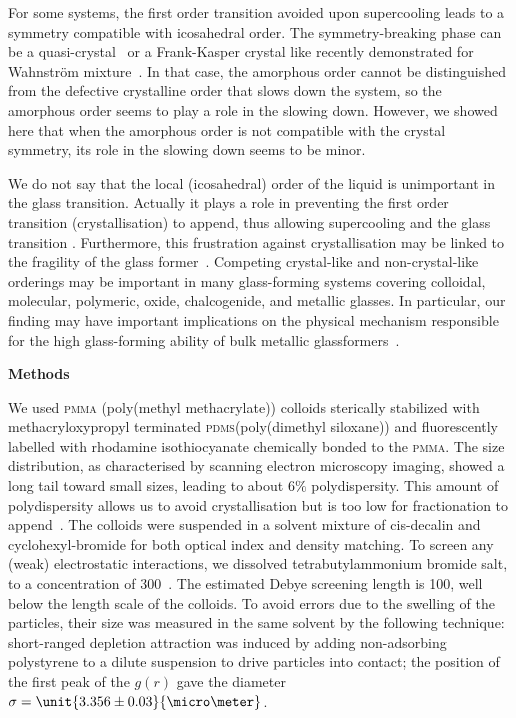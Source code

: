 For some systems, the first order transition avoided upon supercooling leads to a symmetry compatible with icosahedral order. The symmetry-breaking phase can be a quasi-crystal~\citep{Doye2003} or a Frank-Kasper crystal like recently demonstrated for Wahnstr\"om mixture~\citep{Pedersen2010}. In that case, the amorphous order cannot be distinguished from the defective crystalline order that slows down the system, so the amorphous order seems to play a role in the slowing down. However, we showed here that when the amorphous order is not compatible with the crystal symmetry, its role in the slowing down seems to be minor.

We do not say that the local (icosahedral) order of the liquid is unimportant in the glass transition. Actually it plays a role in preventing the first order transition (crystallisation) to append, thus allowing supercooling and the glass transition \cite{TanakaMJPCM}. Furthermore, this frustration against crystallisation may be linked to the fragility of the glass former~\citep{TanakaGJPCM,tanaka2010critical}. Competing crystal-like and non-crystal-like orderings may be important in many glass-forming systems covering colloidal, molecular, polymeric, oxide, chalcogenide, and metallic glasses. In particular, our finding may have important implications on the physical mechanism responsible for the high glass-forming ability of bulk metallic glassformers~\cite{Wang2004}. 

\vspace{1cm}
\noindent
\textbf{Methods}

We used \textsc{pmma} (poly(methyl methacrylate)) colloids sterically stabilized with methacryloxypropyl terminated \textsc{pdms}(poly(dimethyl siloxane)) and fluorescently labelled with rhodamine isothiocyanate chemically bonded to the \textsc{pmma}. The size distribution, as characterised by scanning electron microscopy imaging, showed a long tail toward small sizes, leading to about $6\%$ polydispersity. This amount of polydispersity allows us to avoid crystallisation but is too low for fractionation to append~\citep{Fasolo2003}. The colloids were suspended in a solvent mixture of cis-decalin and cyclohexyl-bromide for both optical index and density matching. To screen any (weak) electrostatic interactions, we dissolved tetrabutylammonium bromide salt, to a concentration of \unit{300}{\nano\mole\per\liter}~\citep{royall2005}. The estimated Debye screening length is \unit{100}{\nano\metre}, well below the length scale of the colloids. To avoid errors due to the swelling of the particles, their size was measured in the same solvent by the following technique: short-ranged depletion attraction was induced by adding non-adsorbing polystyrene to a dilute suspension to drive particles into contact; the position of the first peak of the $g(r)$ gave the diameter $\sigma = \unit{3.356\pm0.03}{\micro\meter}$.

